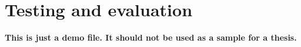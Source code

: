 \chapter{Testing and evaluation}
\label{chapter:testing}

\textbf{This is just a demo file. It should not be used as a sample for a thesis.}\\
